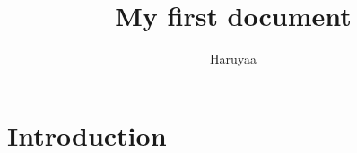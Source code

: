 \documentclass{article}
\title{My first document}
\author{Haruyaa}
\begin{document}
	\maketitle
	\section{Introduction}
\end{document}

